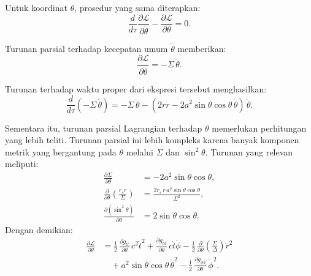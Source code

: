 Untuk koordinat $\theta$, prosedur yang sama diterapkan:
\begin{equation}
    \frac{d}{d\tau}\frac{\partial\mathcal{L}}{\partial\dot{\theta}}
    - \frac{\partial\mathcal{L}}{\partial\theta} = 0.
    \label{eq:el-theta}
\end{equation}

Turunan parsial terhadap kecepatan umum $\dot{\theta}$ memberikan:
\begin{equation}
    \frac{\partial\mathcal{L}}{\partial\dot{\theta}}
    = -\Sigma\,\dot{\theta}.
    \label{eq:dLdthetadot}
\end{equation}

Turunan terhadap waktu proper dari ekspresi tersebut menghasilkan:
\begin{equation}
    \frac{d}{d\tau}\!\left(-\Sigma\,\dot{\theta}\right)
    = -\Sigma\,\ddot{\theta}
      - (2r\dot{r} - 2a^2\sin\theta\cos\theta\,\dot{\theta})\,\dot{\theta}.
    \label{eq:ddtau-dLdthetadot}
\end{equation}

Sementara itu, turunan parsial Lagrangian terhadap $\theta$ memerlukan
perhitungan yang lebih teliti.
Turunan parsial ini lebih kompleks karena banyak komponen metrik
yang bergantung pada $\theta$ melalui $\Sigma$ dan $\sin^2\!\theta$.
Turunan yang relevan meliputi:
\begin{align}
    \frac{\partial\Sigma}{\partial\theta}
    &= -2a^2\sin\theta\cos\theta, \label{eq:dsigma-dtheta} \\[4pt]
    \frac{\partial}{\partial\theta}\!\left(\frac{r_s r}{\Sigma}\right)
    &= \frac{2r_s\, r\, a^2\sin\theta\cos\theta}{\Sigma^2}, \label{eq:drsr-dtheta} \\[4pt]
    \frac{\partial(\sin^2\!\theta)}{\partial\theta}
    &= 2\sin\theta\cos\theta. \label{eq:dsin2-dtheta}
\end{align}
Dengan demikian:
\begin{equation}
\begin{aligned}
    \frac{\partial\mathcal{L}}{\partial\theta}
    &= \frac{1}{2}\,\frac{\partial g_{tt}}{\partial\theta}\,c^2\dot{t}^2
     + \frac{\partial g_{t\phi}}{\partial\theta}\,c\dot{t}\dot{\phi}
     - \frac{1}{2}\,\frac{\partial}{\partial\theta}\!\left(\frac{\Sigma}{\Delta}\right)\dot{r}^2 \\
    &\quad + a^2\sin\theta\cos\theta\,\dot{\theta}^2
     - \frac{1}{2}\,\frac{\partial g_{\phi\phi}}{\partial\theta}\,\dot{\phi}^2.
\end{aligned}
    \label{eq:dL-dtheta}
\end{equation}

